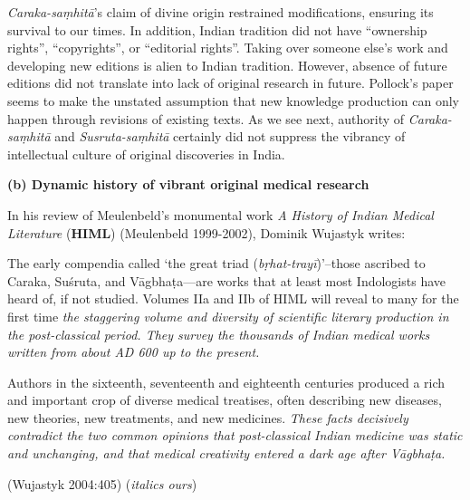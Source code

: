 {\sl Caraka-saṃhitā}'s claim of divine origin restrained modifications, ensuring its survival to our times. In addition, Indian tradition did not have ``ownership rights'', ``copyrights'', or ``editorial rights''.  Taking over someone else's work and developing new editions is alien to Indian tradition.  However, absence of future editions did not translate into lack of original research in future.  Pollock's paper seems to make the unstated assumption that new knowledge production can only happen through revisions of existing texts. As we see next, authority of {\sl Caraka-saṃhitā} and {\sl Susruta-saṃhitā} certainly did not suppress the vibrancy of intellectual culture of original discoveries in India.

{\bf (b) Dynamic history of vibrant original medical research}

In his review of Meulenbeld's monumental work {\sl A History of Indian Medical Literature} ({\bf HIML}) (Meulenbeld 1999-2002), Dominik Wujastyk writes:
\begin{myquote}
The early compendia called `the great triad ({\sl bṛhat-trayī})'--those ascribed to Caraka, Suśruta, and Vāgbhaṭa---are works that at least most Indologists have heard of, if not studied. Volumes IIa and IIb of HIML will reveal to many for the first time {\sl the staggering volume and diversity of scientific literary production in the post-classical period. They survey the thousands of Indian medical works written from about AD 600 up to the present.} 

Authors in the sixteenth, seventeenth and eighteenth centuries produced a rich and important crop of diverse medical treatises, often describing new diseases, new theories, new treatments, and new medicines. {\sl These facts decisively contradict the two common opinions that post-classical Indian medicine was static and unchanging, and that medical creativity entered a dark age after Vāgbhaṭa.} 

\hfill (Wujastyk 2004:405) ({\sl italics ours})
\end{myquote}


